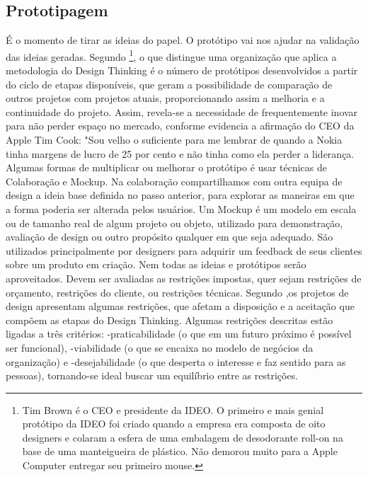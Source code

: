 \documentclass[twoside,twocolumn]{article}
\begin{document}
\subsection{Prototipagem}

\indent É o momento de tirar as ideias do papel. O protótipo vai nos ajudar na validação das ideias geradas.\citep{Vianna2012}
\newline Segundo \citep{Brown2008}\footnote{Tim Brown é o CEO e presidente da IDEO. O primeiro e mais genial protótipo da IDEO foi criado quando a empresa era composta de oito designers e colaram a esfera de uma embalagem de desodorante roll-on na base de uma manteigueira de plástico. Não demorou muito para a Apple Computer entregar seu primeiro mouse.}, o que distingue uma organização que aplica a metodologia do Design Thinking é o número de protótipos desenvolvidos a partir do ciclo de etapas disponíveis, que geram a possibilidade de comparação de outros projetos com projetos atuais, proporcionando assim a melhoria e a continuidade do projeto. Assim, revela-se a necessidade de frequentemente inovar para não perder espaço no mercado, conforme evidencia a afirmação do CEO da Apple Tim Cook: "Sou velho o suficiente para me lembrar de quando a Nokia tinha margens de lucro de 25 por cento e não tinha como ela perder a liderança.\citep{Cook2013}
\newline \indent Algumas formas de multiplicar ou melhorar o protótipo é usar técnicas de Colaboração e Mockup.
\newline Na colaboração compartilhamos com outra equipa de design a ideia base definida no passo anterior, para explorar as maneiras em que a forma poderia ser alterada pelos usuários.
\newline Um Mockup é um modelo em escala ou de tamanho real de algum projeto ou objeto, utilizado para demonstração, avaliação de design ou outro propósito qualquer em que seja adequado. São utilizados principalmente por designers para adquirir um feedback de seus clientes sobre um produto em criação. \citep{EllenLupton2013}
\newline \indent Nem todas as ideias e protótipos serão aproveitados. Devem ser avaliadas as restrições impostas, quer sejam restrições de orçamento, restrições do cliente, ou restrições técnicas.
\newline Segundo \citep{Brown2008} ,os projetos de design apresentam algumas restrições, que afetam a disposição e a aceitação que compõem as etapas do Design Thinking. Algumas restrições descritas estão ligadas a três critérios: \newline {}-praticabilidade (o que em um futuro próximo é possível ser funcional), 
\newline {}-viabilidade (o que se encaixa no modelo de negócios da organização) e 
\newline {}-desejabilidade (o que desperta o interesse e faz sentido para as pessoas), tornando-se ideal buscar um equilíbrio entre as restrições.
\end{document}
